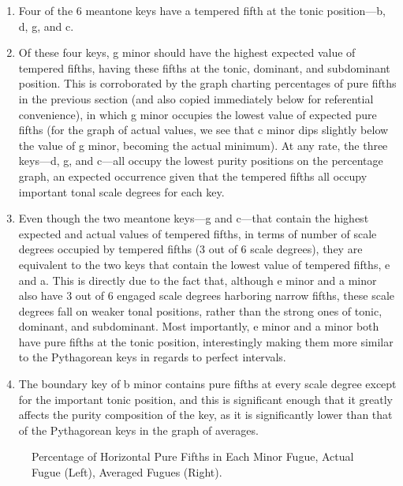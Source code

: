 \begin{enumerate}
\def\labelenumi{\arabic{enumi}.}
\tightlist
\item
  Four of the 6 meantone keys have a tempered fifth at the tonic
  position---b, d, g, and c.
\item
  Of these four keys, g minor should have the highest expected value of
  tempered fifths, having these fifths at the tonic, dominant, and
  subdominant position. This is corroborated by the graph charting
  percentages of pure fifths in the previous section (and also copied
  immediately below for referential convenience), in which g minor
  occupies the lowest value of expected pure fifths (for the graph of
  actual values, we see that c minor dips slightly below the value of g
  minor, becoming the actual minimum). At any rate, the three
  keys---d, g, and c---all occupy the lowest purity positions on
  the percentage graph, an expected occurrence given that the tempered
  fifths all occupy important tonal scale degrees for each key.
\item
  Even though the two meantone keys---g and c---that contain the
  highest expected and actual values of tempered fifths, in terms of
  number of scale degrees occupied by tempered fifths (3 out of 6 scale
  degrees), they are equivalent to the two keys that contain the lowest
  value of tempered fifths, e and a. This is directly due to the fact
  that, although e minor and a minor also have 3 out of 6 engaged scale
  degrees harboring narrow fifths, these scale degrees fall on weaker
  tonal positions, rather than the strong ones of tonic, dominant, and
  subdominant. Most importantly, e minor and a minor both have pure
  fifths at the tonic position, interestingly making them more similar
  to the Pythagorean keys in regards to perfect intervals.
\item
  The boundary key of b minor contains pure fifths at every scale degree
  except for the important tonic position, and this is significant
  enough that it greatly affects the purity composition of the key, as
  it is significantly lower than that of the Pythagorean keys in the
  graph of averages.
\end{enumerate}



\begin{figure}[H]
    \begin{center}
    \caption[Percentage of Horizontal Pure Fifths in Each Minor Fugue. ]{Percentage of Horizontal Pure Fifths in Each Minor Fugue, Actual Fugue (Left), Averaged Fugues (Right).}
    \end{center}
\end{figure}
    
